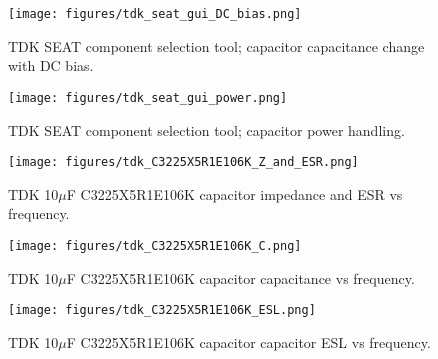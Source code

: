 \documentclass[10pt,twoside]{article}
\begin{document}
\begin{landscape}
\begin{figure}[p]
  \begin{center}
    \texttt{[image: figures/tdk\_seat\_gui\_DC\_bias.png]}\\
  \end{center}
  \caption{TDK SEAT component selection tool; capacitor capacitance change with DC bias.}
  \label{fig:tdk_seat_gui_DC_bias}
\end{figure}
\end{landscape}

\begin{landscape}
\begin{figure}[p]
  \begin{center}
    \texttt{[image: figures/tdk\_seat\_gui\_power.png]}\\
  \end{center}
  \caption{TDK SEAT component selection tool; capacitor power handling.}
  \label{fig:tdk_seat_gui_power}
\end{figure}
\end{landscape}

%
%
\begin{figure}[p]
  \begin{center}
    \texttt{[image: figures/tdk\_C3225X5R1E106K\_Z\_and\_ESR.png]}
  \end{center}
  \caption{TDK 10$\mu$F C3225X5R1E106K capacitor impedance and ESR vs frequency.}
  \label{fig:tdk_Z_and_ESR}
\end{figure}

\begin{figure}[p]
  \begin{center}
    \texttt{[image: figures/tdk\_C3225X5R1E106K\_C.png]}
  \end{center}
  \caption{TDK 10$\mu$F C3225X5R1E106K capacitor capacitance vs frequency.}
  \label{fig:tdk_C}
\end{figure}

\begin{figure}[p]
  \begin{center}
    \texttt{[image: figures/tdk\_C3225X5R1E106K\_ESL.png]}
  \end{center}
  \caption{TDK 10$\mu$F C3225X5R1E106K capacitor capacitor ESL vs frequency.}
  \label{fig:tdk_ESL}
\end{figure}
\end{document}
